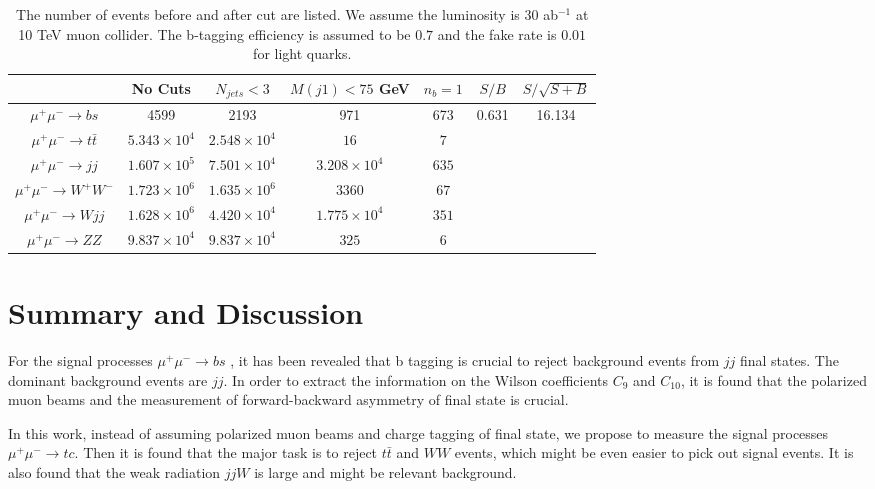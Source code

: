 \documentclass[a4paper,11pt]{article}
\begin{document}
\begin{center}
\begin{table}
  \begin{center}
  \begin{tabular}{c|c|c|c|c|c|c}
  \hline
  &  No Cuts  & $N_{jets}<3$  &    $M(j1)<75$ GeV & $n_b=1$ & $S/B$ &  $S/\sqrt{S+B}$  \\
  \hline
  $\mu^+\mu^-\to bs$     &   4599  &  2193   &     971  &  673   &   \multirow{6}{*}{0.631}   &  \multirow{6}{*}{16.134}  \\
  $\mu^+\mu^-\to t\bar{t}$     &   $5.343\times{10^4}$ &   $2.548\times{10^4}$    &  $16$     & $7$ & & \\
  $\mu^+\mu^-\to jj$     &   $1.607\times{10^5}$  &   $7.501\times{10^4}$    &    $3.208\times{10^4}$   &  $635$  & &     \\
  $\mu^+\mu^-\to W^+W^-$  & $1.723\times{10^6}$  &  $1.635\times{10^6}$ &  $3360$ & $67$ & & \\
  $\mu^+\mu^-\to Wjj$  & $1.628\times{10^6}$  &  $4.420\times{10^4}$   &  $1.775\times{10^4}$   &  $351$  & & \\
  $\mu^+\mu^-\to ZZ$  & $9.837\times{10^4}$ & $9.837\times{10^4}$   &  $325$ &  $6$ & &  \\
  \hline
  \end{tabular}
  \end{center}
  \caption{The number of events before and after cut are listed. We assume the luminosity is $30$ ab$^{-1}$ at 10 TeV muon collider.  The b-tagging efficiency is assumed to be $0.7$ and the fake rate is $0.01$ for light quarks.\label{table:bs:cut}}
\end{table}
\end{center}

\section{Summary and Discussion}\label{Sec:conc}
For the signal processes $\mu^+ \mu^- \to b s$ \cite{Altmannshofer:2022xri}, it has been revealed that b tagging is crucial to reject background events from $jj$ final states. The dominant background events are $j j$. In order to extract the information on the Wilson coefficients $C_{9}$ and $C_{10}$, it is found that the polarized muon beams and the measurement of forward-backward asymmetry of final state is crucial. 

In this work, instead of assuming polarized muon beams and charge tagging of final state, we propose to measure the signal processes $\mu^+ \mu^- \to t c$. Then it is found that the major task is to reject $t \bar{t}$ and $ W W$ events, which might be even easier to pick out signal events. It is also found that the weak radiation $ j j W$ is large and might be relevant background.
\end{document}
